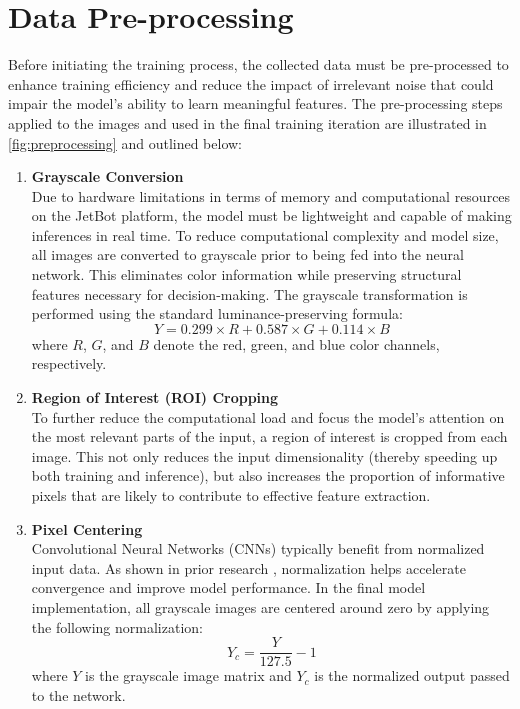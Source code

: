 \section{Data Pre-processing}

Before initiating the training process, the collected data must be pre-processed to enhance training efficiency and reduce the impact of irrelevant noise that could impair the model's ability to learn meaningful features. The pre-processing steps applied to the images and used in the final training iteration are illustrated in \autoref{fig:preprocessing} and outlined below:

\begin{enumerate}
  \item \textbf{Grayscale Conversion} \\
    Due to hardware limitations in terms of memory and computational resources on the JetBot platform, the model must be lightweight and capable of making inferences in real time. To reduce computational complexity and model size, all images are converted to grayscale prior to being fed into the neural network. This eliminates color information while preserving structural features necessary for decision-making. The grayscale transformation is performed using the standard luminance-preserving formula:
    \[
      Y = 0.299 \times R + 0.587 \times G + 0.114 \times B
    \]
    where \( R \), \( G \), and \( B \) denote the red, green, and blue color channels, respectively.

  \item \textbf{Region of Interest (ROI) Cropping} \\
    To further reduce the computational load and focus the model’s attention on the most relevant parts of the input, a region of interest is cropped from each image. This not only reduces the input dimensionality (thereby speeding up both training and inference), but also increases the proportion of informative pixels that are likely to contribute to effective feature extraction.

  \item \textbf{Pixel Centering} \\
    Convolutional Neural Networks (CNNs) typically benefit from normalized input data. As shown in prior research \autocite{pal2016preprocessing}, normalization helps accelerate convergence and improve model performance. In the final model implementation, all grayscale images are centered around zero by applying the following normalization:
    \[
      Y_c = \frac{Y}{127.5} - 1
    \]
    where \( Y \) is the grayscale image matrix and \( Y_c \) is the normalized output passed to the network.


\end{enumerate}
